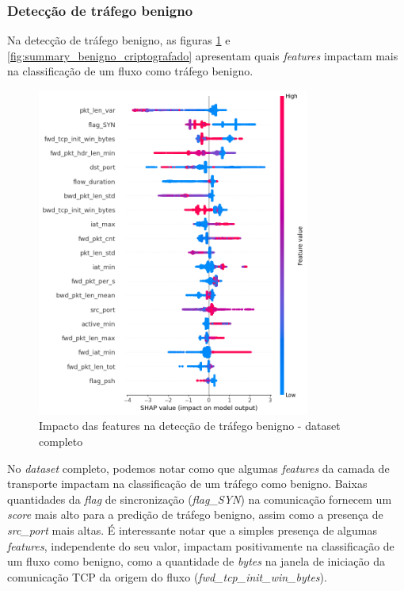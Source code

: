 \documentclass[12pt]{article}
\begin{document}
\subsubsection{Detecção de tráfego benigno}
\label{subsec:benigno}

Na detecção de tráfego benigno, as figuras \ref{fig:summary_benigno_completo} e \ref{fig:summary_benigno_criptografado} apresentam quais \emph{features} impactam mais na classificação de um fluxo como tráfego benigno.

\begin{figure}[h!]
    \centering
    \includegraphics[width=0.8\textwidth]{figures/summary_benigno_completo.png}
    \caption{Impacto das features na detecção de tráfego benigno - dataset completo}
    \label{fig:summary_benigno_completo}
\end{figure}

No \emph{dataset} completo, podemos notar como que algumas \emph{features} da camada de transporte impactam na classificação de um tráfego como benigno. Baixas quantidades da \textit{flag} de sincronização (\textit{flag\_SYN}) na comunicação fornecem um \textit{score} mais alto para a predição de tráfego benigno, assim como a presença de \textit{src\_port} mais altas. É interessante notar que a simples presença de algumas \emph{features}, independente do seu valor, impactam positivamente na classificação de um fluxo como benigno, como a quantidade de \textit{bytes} na janela de iniciação da comunicação TCP da origem do fluxo (\textit{fwd\_tcp\_init\_win\_bytes}).
\end{document}
